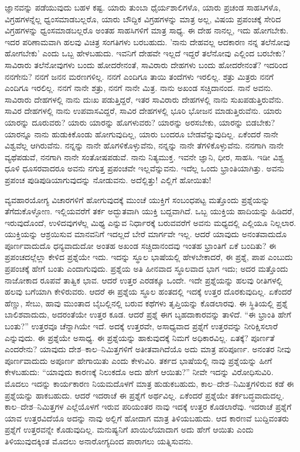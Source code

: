 ಜ್ಞಾನವನ್ನು ಪಡೆಯುವುದು ಬಹಳ ಕಷ್ಟ. ಯಾರು ತುಂಬಾ ಧೈರ್ಯಶಾಲಿಗಳೊ, ಯಾರು ಪ್ರಚಂಡ ಸಾಹಸಿಗಳೊ, ವಿಗ್ರಹಗಳನ್ನೆಲ್ಲ ಧ್ವಂಸಮಾಡಬಲ್ಲರೊ, ಯಾರು ಬೌದ್ದಿಕ ವಿಗ್ರಹಗಳನ್ನು ಮಾತ್ರ ಅಲ್ಲ, ವಿಷಯ ಪ್ರಪಂಚಕ್ಕೆ ಸೇರಿದ ವಿಗ್ರಹಗಳನ್ನು ಧ್ವಂಸಮಾಡಬಲ್ಲರೊ ಅಂತಹ ಸಾಹಸಿಗಳಿಗೆ ಮಾತ್ರ ಸಾಧ್ಯ. ಈ ದೇಹ ನಾನಲ್ಲ, ಇದು ಹೋಗಬೇಕು. ಇದರ ಪರಿಣಾಮವಾಗಿ ಹಲವು ವಿಚಿತ್ರ ಸಂಗತಿಗಳು ಬರಬಹುದು. 'ನಾನು ದೇಹವಲ್ಲ ಆದಕಾರಣ ನನ್ನ ತಲೆನೋವು ಹೋಗಬೇಕು' ಎಂದು ಒಬ್ಬ ಹೇಳಬಹುದು. ಇವನಿಗೆ ದೇಹವೇ ಇಲ್ಲದೆ ಇದ್ದರೆ ತಲೆನೋವು ಎಲ್ಲಿಂದ ಬರಬೇಕು? ಸಾವಿರಾರು ತಲೆನೋವುಗಳು ಬಂದು ಹೋದರೇನಂತೆ, ಸಾವಿರಾರು ದೇಹಗಳು ಬಂದು ಹೋದರೇನಂತೆ? ಇದರಿಂದ ನನಗೇನು? ನನಗೆ ಜನನ ಮರಣಗಳಿಲ್ಲ. ನನಗೆ ಎಂದಿಗೂ ತಾಯಿ ತಂದೆಗಳು ಇರಲಿಲ್ಲ. ಶತ್ರು ಮಿತ್ರರು ನನಗೆ ಎಂದಿಗೂ ಇರಲಿಲ್ಲ. ನನಗೆ ನಾನೇ ಶತ್ರು, ನನಗೆ ನಾನೇ ಮಿತ್ರ. ನಾನು ಅಖಂಡ ಸಚ್ಚಿದಾನಂದ. ನಾನೆ ಅವನು. ಸಾವಿರಾರು ದೇಹಗಳಲ್ಲಿ ನಾನು ದುಃಖ ಪಡುತ್ತಿದ್ದರೆ, ಇತರ ಸಾವಿರಾರು ದೇಹಗಳಲ್ಲಿ ನಾನು ಸುಖಪಡುತ್ತಿರುವೆನು. ಸಾವಿರ ದೇಹಗಳಲ್ಲಿ ನಾನು ಉಪವಾಸವಿದ್ದರೆ, ಸಾವಿರ ದೇಹಗಳಲ್ಲಿ ಭೂರಿ ಭೋಜನ ಮಾಡುತ್ತಿರುವೆನು. ಯಾರು ಯಾರನ್ನು ದೂರುವರು? ಯಾರು ಯಾರನ್ನು ಹೊಗಳುವರು? ಯಾರನ್ನು ಅರಸಬೇಕು, ಯಾರನ್ನು ಬಿಡಬೇಕು? ಯಾರನ್ನೂ ನಾನು ಹುಡುಕಿಕೊಂಡು ಹೋಗುವುದಿಲ್ಲ, ಯಾರು ಬಂದರೂ ಬೇಡವೆನ್ನುವುದಿಲ್ಲ. ಏಕೆಂದರೆ ನಾನೇ ವಿಶ್ವವೆಲ್ಲ ಆಗಿರುವೆನು. ನನ್ನನ್ನು ನಾನೇ ಹೊಗಳಿಕೊಳ್ಳುವೆನು, ನನ್ನನ್ನು ನಾನೇ ತೆಗಳಿಕೊಳ್ಳುವೆನು. ನನಗಾಗಿ ನಾನೇ ವ್ಯಥೆಪಡುವೆ, ನನಗಾಗಿ ನಾನೇ ಸಂತೋಷಪಡುವೆ. ನಾನು ನಿತ್ಯಮುಕ್ತ. ಇವನೇ ಜ್ಞಾನಿ, ಧೀರ, ಸಾಹಸಿ. ಇಡೀ ವಿಶ್ವ ಧೂಳಿ ಧೂಸರವಾದರೂ ಅವನು ನಗುತ್ತ ಪ್ರಪಂಚವೇ ಇಲ್ಲವೆನ್ನುವನು. ಇದೆಲ್ಲ ಒಂದು ಭ್ರಾಂತಿಯಾಗಿತ್ತು. ಅವನು ಪ್ರಪಂಚ ಪುಡಿಪುಡಿಯಾಗುವುದನ್ನು ನೋಡುವನು. ಅದೆಲ್ಲಿತ್ತು! ಎಲ್ಲಿಗೆ ಹೋಯಿತು!

ವ್ಯವಹಾರಯೋಗ್ಯ ವಿಚಾರಗಳಿಗೆ ಹೋಗುವುದಕ್ಕೆ ಮುಂಚೆ ಯುಕ್ತಿಗೆ ಸಂಬಂಧಪಟ್ಟ ಮತ್ತೊಂದು ಪ್ರಶ್ನೆಯನ್ನು ತೆಗೆದುಕೊಳ್ಳೋಣ. ಇಲ್ಲಿಯವರೆಗೆ ತರ್ಕ ಅದ್ಭುತವಾಗಿ ಯುಕ್ತಿ ಬದ್ದವಾಗಿದೆ. ಒಬ್ಬ ಯುಕ್ತಿಯ ಹಾದಿಯನ್ನು ಹಿಡಿದರೆ, ಇರುವುದೊಂದೆ, ಉಳಿದವುಗಳೆಲ್ಲ ಮಿಥ್ಯ ಎನ್ನುವ ನಿರ್ಧಾರಕ್ಕೆ ಬರುವವರೆಗೆ ಅವನು ಮಧ್ಯದಲ್ಲಿ ಎಲ್ಲಿಯೂ ನಿಲ್ಲಲಾರ. ಯುಕ್ತಿಯನ್ನು ಆಶ್ರಯಿಸುವ ಮಾನವನಿಗೆ ಇದಲ್ಲದೆ ಬೇರೆ ಮಾರ್ಗವೇ ಇಲ್ಲ. ಆದರೆ ಯಾವುದು ಅನಂತವಾದುದೊ ಪೂರ್ಣವಾದುದೊ ಧನ್ಯವಾದುದೋ ಅಂತಹ ಅಖಂಡ ಸಚ್ಚಿದಾನಂದವು ಇಂತಹ ಭ್ರಾಂತಿಗೆ ಏಕೆ ಬಂದಿತು? ಈ ಪ್ರಪಂಚದಲ್ಲೆಲ್ಲಾ ಕೇಳಿದ ಪ್ರಶ್ನೆಯೇ ಇದು. ಇದನ್ನು ಸ್ಥೂಲ ಭಾಷೆಯಲ್ಲಿ ಹೇಳಬೇಕಾದರೆ, ಈ ಪ್ರಶ್ನೆ, ಪಾಪ ಎಂಬುದು ಪ್ರಪಂಚಕ್ಕೆ ಹೇಗೆ ಬಂತು ಎಂದಾಗುವುದು. ಪ್ರಶ್ನೆಯ ಅತಿ ಹೀನವಾದ ಸ್ಥೂಲವಾದ ಭಾಗ ಇದು; ಅದರ ಮತ್ತೊಂದು ನಾಜೋಕಾದ ರೂಪವೆ ತಾತ್ವಿಕ ಭಾವ. ಆದರೆ ಉತ್ತರ ಎರಡಕ್ಕೂ ಒಂದೇ. ಇದೇ ಪ್ರಶ್ನೆಯನ್ನು ಹಲವು ರೀತಿಗಳಲ್ಲಿ ಹಲವು ಬಗೆಯಾಗಿ ಕೇಳಿರುವರು. ಆದರೆ ಈ ಪ್ರಶ್ನೆಯ ಸ್ಥೂಲ ಹಂತದಲ್ಲಿ ಇದಕ್ಕೆ ಉತ್ತರ ದೊರಕುವುದಿಲ್ಲ. ಏಕೆಂದರೆ ಹೆಣ್ಣು, ಸೇಬು, ಹಾವು ಮುಂತಾದ ಬೈಬಲ್ಲಿನಲ್ಲಿ ಬರುವ ಕಥೆಗಳು ತೃಪ್ತಿಯನ್ನು ಕೊಡಲಾರವು. ಈ ಸ್ಥಿತಿಯಲ್ಲಿ ಪ್ರಶ್ನೆ ಬಾಲಿಶವಾದುದು, ಅದರಂತೆಯೇ ಉತ್ತರ ಕೂಡ. ಆದರೆ ಪ್ರಶ್ನೆ ಈಗ ಬೃಹದಾಕಾರವನ್ನು ತಾಳಿದೆ. “ಈ ಭ್ರಾಂತಿ ಹೇಗೆ ಬಂತು?'' ಉತ್ತರವೂ ಚೆನ್ನಾಗಿಯೇ ಇದೆ. ಅದಕ್ಕೆ ಉತ್ತರವೇ, ಅಸಾಧ್ಯವಾದ ಪ್ರಶ್ನೆಗೆ ಉತ್ತರವನ್ನು ನೀರಿಕ್ಷಿಸಲಾರೆ ಎನ್ನುವುದು. ಈ ಪ್ರಶ್ನೆಯೇ ಅಸಾಧ್ಯ. ಈ ಪ್ರಶ್ನೆಯನ್ನು ಹಾಕುವುದಕ್ಕೆ ನಿಮಗೆ ಅಧಿಕಾರವಿಲ್ಲ. ಏತಕ್ಕೆ? ಪೂರ್ಣತೆ ಎಂದರೇನು? ಯಾವುದು ದೇಶ–ಕಾಲ–ನಿಮಿತ್ತಗಳಿಗೆ ಅತೀತವಾಗಿದೆಯೊ ಅದು ಮಾತ್ರ ಪರಿಪೂರ್ಣ. ಅನಂತರ ನೀವು ಪೂರ್ಣವಾದುದು ಅಪೂರ್ಣ ಹೇಗಾಯಿತು ಎಂದು ಕೇಳುವಿರಿ. ತರ್ಕದ ಭಾಷೆಯಲ್ಲಿ ನಾವು ಪ್ರಶ್ನೆಯನ್ನು ಹೀಗೆ ಕೇಳಬಹುದು: “ಯಾವುದು ಕಾರಣಕ್ಕೆ ನಿಲುಕದೊ ಅದು ಹೇಗೆ ಆಯಿತು?'' ನೀವೇ ಇದನ್ನು ವಿರೋಧಿಸುವಿರಿ. ಮೊದಲು ಇದನ್ನು ಕಾರ್ಯಕಾರಣ ನಿಯಮದೊಳಗೆ ಮಾತ್ರ ಹುಡುಕಬಹುದು, ಕಾಲ–ದೇಶ–ನಿಮಿತ್ತಗಳಿರುವ ಕಡೆ ಈ ಪ್ರಶ್ನೆಯನ್ನು ಹಾಕಬಹುದು. ಆದರೆ ಇದರಾಚೆ ಈ ಪ್ರಶ್ನೆಗೆ ಅರ್ಥವಿಲ್ಲ. ಏಕೆಂದರೆ ಪ್ರಶ್ನೆಯೇ ತರ್ಕಬದ್ಧವಾದುದಲ್ಲ. ಕಾಲ–ದೇಶ–ನಿಮಿತ್ತಗಳ ಎಲ್ಲೆಯೊಳಗೆ ಇರುವ ಪರಿಯಂತರ ನಾವು ಇದಕ್ಕೆ ಉತ್ತರ ಕೊಡಲಾರೆವು. ಇದರಾಚೆ ಪ್ರಶ್ನೆಗೆ ಯಾವ ಉತ್ತರವಿದೆಯೊ ಅದನ್ನು ನಾವು ಅಲ್ಲಿಗೆ ಹೋದಾಗ ಮಾತ್ರ ತಿಳಿಯಬಹುದು. ಆದ ಕಾರಣವೆ ಬುದ್ದಿವಂತರು ಪ್ರಶ್ನೆಗೆ ಉತ್ತರವನ್ನೇ ಕೊಡುವುದಿಲ್ಲ. ಮನುಷ್ಯನಿಗೆ ಖಾಯಿಲೆಯಾದಾಗ ಅದು ಹೇಗೆ ಆಯಿತು ಎಂದು ತಿಳಿಯುವುದಕ್ಕಿಂತ ಮೊದಲು ಅನಾರೋಗ್ಯದಿಂದ ಪಾರಾಗಲು ಯತ್ನಿಸುವನು.

